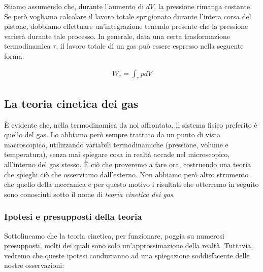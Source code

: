 Stiamo assumendo che, durante l'aumento di $dV$, la pressione
rimanga costante. Se però vogliamo calcolare il lavoro totale
sprigionato durante l'intera corsa del pistone, dobbiamo effettuare
un'integrazione tenendo presente che la pressione varierà durante
tale processo. In generale, data una certa trasformazione termodinamica
$\tau$, il lavoro totale di un gas può essere espresso nella
seguente forma:

\begin{align}
    W_\tau = \int_\tau pdV
\end{align}


\subsection{La teoria cinetica dei gas}
È evidente che, nella termodinamica da noi affrontata, il sistema
fisico preferito è quello del gas. Lo abbiamo però sempre trattato
da un punto di vista macroscopico, utilizzando variabili termodinamiche
(pressione, volume e temperatura), senza mai spiegare cosa in realtà
accade nel microscopico, all'interno del gas stesso. È ciò che proveremo
a fare ora, costruendo una teoria che spieghi ciò che osserviamo
dall'esterno. Non abbiamo però altro strumento che quello della meccanica
e per questo motivo i risultati che otterremo in seguito sono
conosciuti sotto il nome di \textit{teoria cinetica dei gas}.

\subsubsection*{Ipotesi e presupposti della teoria}
Sottolineamo che la teoria cinetica, per funzionare, poggia su numerosi
presupposti, molti dei quali sono solo un'approssimazione della realtà.
Tuttavia, vedremo che queste ipotesi condurranno ad una spiegazione
soddisfacente delle nostre osservazioni:

